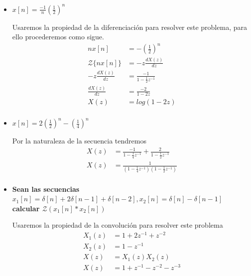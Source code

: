\documentclass[12pt]{article}
\begin{document}
\begin{itemize}
\item \textbf{$x[n]=\frac{-1}{n}(\frac{1}{2})^n$}
    \vspace{5mm}

    Usaremos la propiedad de la diferenciación para resolver este problema, para ello procederemos como sigue.
    \begin{equation}
        \begin{split}
            nx[n]&=-(\frac{1}{2})^n\\
            \mathscr{Z}\{nx[n]\}&=-z\frac{dX(z)}{dz}\\
            -z\frac{dX(z)}{dz}&=\frac{-1}{1-\frac{1}{2}z^{-1}}\\
            \frac{dX(z)}{dz}&=\frac{-2}{1-2z}\\
            X(z)&=log(1-2z)\\
        \end{split}
        \label{eq:ejer8}
    \end{equation}
    
\item \textbf{$x[n]=2(\frac{1}{2})^n-(\frac{1}{4})^n$}
    \vspace{5mm}

    Por la naturaleza de la secuencia tendremos
    \begin{equation}
        \begin{split}
            X(z)&=\frac{-1}{1-\frac{1}{4}z^{-1}}+\frac{2}{1-\frac{1}{2}z^{-1}}\\
            X(z)&=\frac{1}{(1-\frac{1}{4}z^{-1})(1-\frac{1}{2}z^{-1})}\\
        \end{split}
        \label{eq:ejer9}
    \end{equation}


\item \textbf{Sean las secuencias $x_{1}[n]=\delta[n]+2\delta[n-1]+\delta[n-2],x_{2}[n]=\delta[n]-\delta[n-1]$ calcular $\mathscr{Z}(x_{1}[n]*x_{2}[n])$}
    \vspace{5mm}

    Usaremos la propiedad de la convolución para resolver este problema
    \begin{equation}
        \begin{split}
            X_{1}(z)&=1+2z^{-1}+z^{-2}\\
            X_{2}(z)&=1-z^{-1}\\
            X(z)&=X_{1}(z)X_{2}(z)\\
            X(z)&=1+z^{-1}-z^{-2}-z^{-3}\\
        \end{split}
        \label{eq:ejerlast}
    \end{equation}
\end{itemize}
\end{document}
